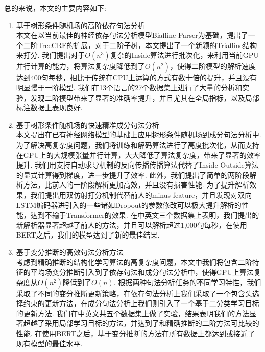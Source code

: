 总的来说，本文的主要内容如下:
\begin{enumerate}
  \item 基于树形条件随机场的高阶依存句法分析\\
        \indent 本文在以当前最佳的神经依存句法分析模型Biaffine Parser为基础，提出了一个二阶TreeCRF的扩展，对于二阶子树，本文提出了一个新颖的Triaffine结构来打分.
        我们提出对于$O(n^3)$复杂的Inside算法进行批次化，来利用当前GPU并行计算的能力，将算法复杂度降低到了$O(n^2)$，使得二阶模型的解析速度达到400句每秒，相比于传统在CPU上运算的方式有数十倍的提升，并且没有明显慢于一阶模型.
        我们在13个语言的27个数据集上进行了大量的分析和实验，发现二阶模型带来了显著的准确率提升，并且尤其在全局指标，以及局部标注数据上表现良好.
  \item 基于树形条件随机场的快速精准成分句法分析\\
        \indent 本文提出在已有神经网络模型的基础上应用树形条件随机场到成分句法分析中.
        为了解决高复杂度问题，我们将训练和解码算法进行了高度批次化，从而支持在GPU上的大规模张量并行计算，大大降低了算法复杂度，带来了显著的效率提升.
        我们用支持自动求导机制的反向传播传播算法代替了Inside-Outside算法的显式计算得到梯度，进一步提升了效率.
        此外，我们提出了简单的两阶段解析方法，比前人的一阶段解析更加高效，并且没有损害性能.
        为了提升解析效果，我们提出用双仿射打分机制代替前人的minus feature，并且发现对双向LSTM编码器进引入的一些诸如Dropout的参数修改可以极大提升解析的性能，达到不输于Transformer的效果.
        在中英文三个数据集上表明，我们提出的新解析器显著超越了前人的方法，并且可以解析超过1,000句每秒，在使用BERT之后，我们的模型达到了新的最佳结果.
  \item 基于变分推断的高效句法分析方法\\
        \indent 考虑到精确推断的结构化学习算法的高复杂度问题，本文中我们将包含二阶特征的平均场变分推断引入到了依存句法和成分句法分析中，使得GPU上算法复杂度从$O(n^2)$降低到了$O(n)$.
        根据两种句法分析任务的不同学习特性，我们采取了不同的变分推断更新策略，在依存句法分析上我们采取了一个包含头选择约束的更新方法，在成分句法分析上我们则引入了一个基于二分类学习目标的更新方法.
        我们在中英文共五个数据集上做了实验，结果表明我们的方法显著超越了采用局部学习目标的方法，并达到了和精确推断的二阶方法可比较的性能.
        在使用BERT之后，基于变分推断的方法在所有数据上都达到或接近了现有模型的最佳水平.
\end{enumerate}

